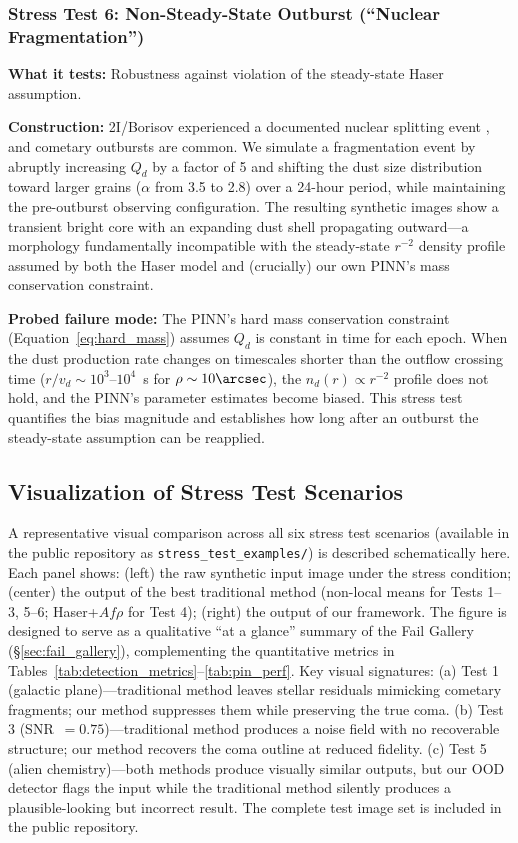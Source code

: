 \documentclass[usenatbib]{mnras}
\begin{document}
\subsubsection{Stress Test 6: Non-Steady-State Outburst (``Nuclear Fragmentation'')}

\textbf{What it tests:} Robustness against violation of the steady-state Haser assumption.

\textbf{Construction:} 2I/Borisov experienced a documented nuclear splitting event \citep{jewitt20}, and cometary outbursts are common. We simulate a fragmentation event by abruptly increasing $Q_d$ by a factor of 5 and shifting the dust size distribution toward larger grains ($\alpha$ from 3.5 to 2.8) over a 24-hour period, while maintaining the pre-outburst observing configuration. The resulting synthetic images show a transient bright core with an expanding dust shell propagating outward---a morphology fundamentally incompatible with the steady-state $r^{-2}$ density profile assumed by both the Haser model and (crucially) our own PINN's mass conservation constraint.

\textbf{Probed failure mode:} The PINN's hard mass conservation constraint (Equation~\ref{eq:hard_mass}) assumes $Q_d$ is constant in time for each epoch. When the dust production rate changes on timescales shorter than the outflow crossing time ($r/v_d \sim 10^3$--$10^4$~s for $\rho \sim 10\arcsec$), the $n_d(r) \propto r^{-2}$ profile does not hold, and the PINN's parameter estimates become biased. This stress test quantifies the bias magnitude and establishes how long after an outburst the steady-state assumption can be reapplied.

\subsection{Visualization of Stress Test Scenarios}

A representative visual comparison across all six stress test scenarios (available in the public repository as \texttt{stress\_test\_examples/}) is described schematically here. Each panel shows: (left) the raw synthetic input image under the stress condition; (center) the output of the best traditional method (non-local means for Tests 1--3, 5--6; Haser+$Af\rho$ for Test 4); (right) the output of our framework. The figure is designed to serve as a qualitative ``at a glance'' summary of the Fail Gallery (\S\ref{sec:fail_gallery}), complementing the quantitative metrics in Tables~\ref{tab:detection_metrics}--\ref{tab:pin_perf}. Key visual signatures: (a) Test 1 (galactic plane)---traditional method leaves stellar residuals mimicking cometary fragments; our method suppresses them while preserving the true coma. (b) Test 3 (SNR~$=0.75$)---traditional method produces a noise field with no recoverable structure; our method recovers the coma outline at reduced fidelity. (c) Test 5 (alien chemistry)---both methods produce visually similar outputs, but our OOD detector flags the input while the traditional method silently produces a plausible-looking but incorrect result. The complete test image set is included in the public repository.
\end{document}
